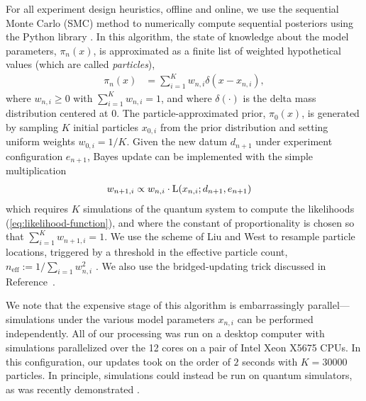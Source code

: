 \documentclass[aps,nofootinbib,twocolumn,superscriptaddress]{revtex4}
\newcommand{\mps}{x}
\newcommand{\eps}{e}
\newcommand{\data}{d}
\begin{document}
For all experiment design heuristics, offline and online,
we use the sequential Monte Carlo (SMC) \cite{doucet_tutorial_2009}
method to numerically compute sequential posteriors
using the Python library \qinfer  \cite{granade_qinfer_2017}.
In this algorithm, the state of knowledge about the model
parameters, $\pi_n(\mps)$,
is approximated as a finite list of weighted hypothetical values
(which are called \textit{particles}),
\begin{align}
    \pi_n(\mps)
        &= \sum_{i=1}^{K}w_{n,i} \delta(\mps-\mps_{n,i}),
    \label{eq:particle-approximation}
\end{align}
where $w_{n,i}\geq 0$ with $\sum_{i=1}^K w_{n,i}=1$, and where
$\delta(\cdot)$ is the delta mass distribution centered at $0$.
The particle-approximated prior, $\pi_0(\mps)$, is generated by
sampling $K$ initial particles $\mps_{0,i}$ from the prior distribution
and setting uniform weights $w_{0,i}=1/K$.
Given the new datum $\data_{n+1}$ under experiment
configuration $\eps_{n+1}$,
Bayes update can be implemented with the simple multiplication
\begin{align}
    w_{n+1,i}
        &\propto w_{n,i}\cdot \Lhood(\mps_{n,i};\data_{n+1},\eps_{n+1})
    \label{eq:particle-update}
\end{align}
which requires $K$ simulations of the quantum system to
compute the likelihoods (\autoref{eq:likelihood-function}), and where
the constant of proportionality is chosen so that
$\sum_{i=1}^K w_{n+1,i}=1$.
We use the scheme of Liu and West \cite{liu_combined_2001}
to resample particle locations,
triggered by a threshold in the effective particle count,
$n_\text{eff}:=1/\sum_{i=1} w_{n,i}^2$ \cite{granade_qinfer_2017}.
We also use the bridged-updating trick discussed in
Reference~\cite{hincks_statistical_2018}.

We note that the expensive stage of this algorithm is
embarrassingly parallel---simulations under the various
model parameters $\mps_{n,i}$ can be performed independently.
All of our processing was run on a desktop computer with simulations
parallelized over the 12 cores on a pair of Intel Xeon X5675 CPUs.
In this configuration, our updates took on the order of $2$ seconds
with $K=30000$ particles.
In principle, simulations could instead be run on quantum simulators,
as was recently demonstrated \cite{wang_experimental_2017}.
\end{document}
